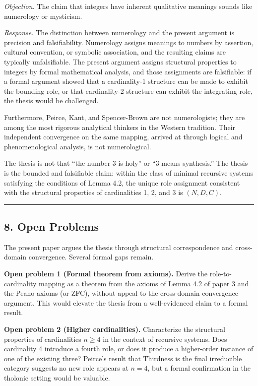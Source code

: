 \documentclass[
  11pt,
  letterpaper,
]{article}
\begin{document}
\emph{Objection.} The claim that integers have inherent qualitative
meanings sounds like numerology or mysticism.

\emph{Response.} The distinction between numerology and the present
argument is precision and falsifiability. Numerology assigns meanings to
numbers by assertion, cultural convention, or symbolic association, and
the resulting claims are typically unfalsifiable. The present argument
assigns structural properties to integers by formal mathematical
analysis, and those assignments are falsifiable: if a formal argument
showed that a cardinality-1 structure can be made to exhibit the
bounding role, or that cardinality-2 structure can exhibit the
integrating role, the thesis would be challenged.

Furthermore, Peirce, Kant, and Spencer-Brown are not numerologists; they
are among the most rigorous analytical thinkers in the Western
tradition. Their independent convergence on the same mapping, arrived at
through logical and phenomenological analysis, is not numerological.

The thesis is not that ``the number 3 is holy'' or ``3 means
synthesis.'' The thesis is the bounded and falsifiable claim: within the
class of minimal recursive systems satisfying the conditions of Lemma
4.2, the unique role assignment consistent with the structural
properties of cardinalities 1, 2, and 3 is \((N, D, C)\).

\begin{center}\rule{0.5\linewidth}{0.5pt}\end{center}

\subsection{8. Open Problems}\label{open-problems}

The present paper argues the thesis through structural correspondence
and cross-domain convergence. Several formal gaps remain.

\textbf{Open problem 1 (Formal theorem from axioms).} Derive the
role-to-cardinality mapping as a theorem from the axioms of Lemma 4.2 of
paper 3 and the Peano axioms (or ZFC), without appeal to the
cross-domain convergence argument. This would elevate the thesis from a
well-evidenced claim to a formal result.

\textbf{Open problem 2 (Higher cardinalities).} Characterize the
structural properties of cardinalities \(n \ge 4\) in the context of
recursive systems. Does cardinality 4 introduce a fourth role, or does
it produce a higher-order instance of one of the existing three?
Peirce's result that Thirdness is the final irreducible category
suggests no new role appears at \(n = 4\), but a formal confirmation in
the tholonic setting would be valuable.
\end{document}

